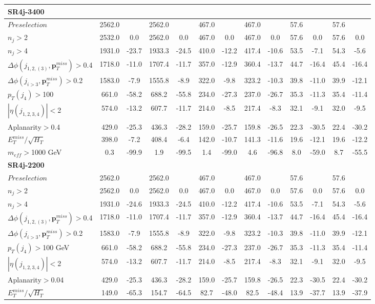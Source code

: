 \documentclass[a4paper,11pt]{article}
\begin{document}
\begin{landscape}
\begin{table}[h]
\begin{tabular}{ | l | c c c c  || c c c c || c c c c | }
\multicolumn{13}{|l|}{\textbf{SR4j-3400}} \\ \hline		
$Preselection$&2562.0&&2562.0&&467.0&&467.0&&57.6&&57.6&
\\
$n_j>$2&2532.0&0.0&2562.0&0.0&467.0&0.0&467.0&0.0&57.6&0.0&57.6&0.0
\\
$n_j>$4&1931.0&-23.7&1933.3&-24.5&410.0&-12.2&417.4&-10.6&53.5&-7.1&54.3&-5.6
\\
$\Delta \phi(j_{1,2,(3)},\mathbf{p}_T^{miss})>$0.4&1718.0&-11.0&1707.4&-11.7&357.0&-12.9&360.4&-13.7&44.7&-16.4&45.4&-16.4
\\
$\Delta \phi(j_{i>3},\mathbf{p}_T^{miss})>$0.2&1583.0&-7.9&1555.8&-8.9&322.0&-9.8&323.2&-10.3&39.8&-11.0&39.9&-12.1
\\
$p_T(j_4)>$100&661.0&-58.2&688.2&-55.8&234.0&-27.3&237.0&-26.7&35.3&-11.3&35.4&-11.4
\\
$|\eta(j_{1,2,3,4})|<$2&574.0&-13.2&607.7&-11.7&214.0&-8.5&217.4&-8.3&32.1&-9.1&32.0&-9.5
\\
Aplanarity$>$0.4&429.0&-25.3&436.3&-28.2&159.0&-25.7&159.8&-26.5&22.3&-30.5&22.4&-30.2
\\
$E_T^{miss}/\sqrt{H_T}$&398.0&-7.2&408.4&-6.4&142.0&-10.7&141.3&-11.6&19.6&-12.1&19.6&-12.2
\\
$m_{eff}>$1000 GeV&0.3&-99.9&1.9&-99.5&1.4&-99.0&4.6&-96.8&8.0&-59.0&8.7&-55.5
\\ \hline 
							\multicolumn{13}{|l|}{\textbf{SR4j-2200}} \\ \hline		
$Preselection$&2562.0&&2562.0&&467.0&&467.0&&57.6&&57.6&
\\
$n_j>$2&2562.0&0.0&2562.0&0.0&467.0&0.0&467.0&0.0&57.6&0.0&57.6&0.0
\\
$n_j>$4&1931.0&-24.6&1933.3&-24.5&410.0&-12.2&417.4&-10.6&53.5&-7.1&54.3&-5.6
\\
$\Delta \phi(j_{1,2,(3)},\mathbf{p}_T^{miss})>$0.4&1718.0&-11.0&1707.4&-11.7&357.0&-12.9&360.4&-13.7&44.7&-16.4&45.4&-16.4
\\
$\Delta \phi(j_{i>3},\mathbf{p}_T^{miss})>$0.2&1583.0&-7.9&1555.8&-8.9&322.0&-9.8&323.2&-10.3&39.8&-11.0&39.9&-12.1
\\
$p_T(j_4)>$100 GeV&661.0&-58.2&688.2&-55.8&234.0&-27.3&237.0&-26.7&35.3&-11.3&35.4&-11.4
\\
$|\eta(j_{1,2,3,4})|<$2&574.0&-13.2&607.7&-11.7&214.0&-8.5&217.4&-8.3&32.1&-9.1&32.0&-9.5
\\
Aplanarity$>$0.04&429.0&-25.3&436.3&-28.2&159.0&-25.7&159.8&-26.5&22.3&-30.5&22.4&-30.2
\\
$E_T^{miss}/\sqrt{H_T}$&149.0&-65.3&154.7&-64.5&82.7&-48.0&82.5&-48.4&13.9&-37.7&13.9&-37.9

\end{tabular}
\end{table}
\end{landscape}
\end{document}
